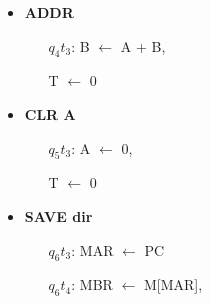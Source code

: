 \documentclass{article}
\begin{document}
\begin{table}[!htbp]
{\begin{minipage}{\textwidth}
\begin{multicols}{2}
\begin{itemize}
\begin{enumerate}[itemsep=-1ex]
                                
                        
                        \end{enumerate}
                \end{itemize}
                
                
                
                
                \begin{itemize}
                    \item \textbf{ADDR}
                        \begin{enumerate}[itemsep=-1ex] 
                            \item[$q_4t_3$: ]  
                                B $\leftarrow$ A + B,
                                
                                T $\leftarrow$ 0
                        
                        \end{enumerate}
                \end{itemize}
                
                
                
                \begin{itemize}
                    \item \textbf{CLR A}
                        \begin{enumerate}[itemsep=-1ex] 
                            \item[$q_5t_3$:]  
                                A $\leftarrow$ 0,
                                
                                T $\leftarrow$ 0
                        
                        \end{enumerate}
                \end{itemize}
            
                
                
                \begin{itemize}
                    \item \textbf{SAVE dir}
                        \begin{enumerate}[itemsep=-1ex] 
                            \item[$q_6t_3$:]  
                                MAR $\leftarrow$ PC
                            
                            \item[$q_6t_4$:]
                                MBR $\leftarrow$ M[MAR],
                                

\end{enumerate}
\end{itemize}
\end{multicols}
\end{minipage}}
\end{table}
\end{document}

